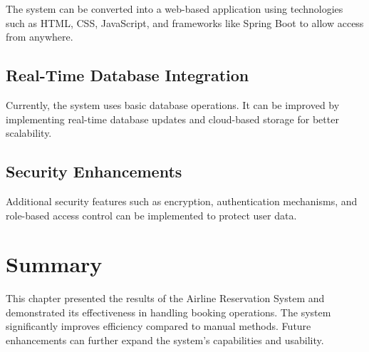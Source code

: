 The system can be converted into a web-based application using technologies such as HTML, CSS, JavaScript, and frameworks like Spring Boot to allow access from anywhere.

\subsection{Real-Time Database Integration}

Currently, the system uses basic database operations. It can be improved by implementing real-time database updates and cloud-based storage for better scalability.

\subsection{Security Enhancements}

Additional security features such as encryption, authentication mechanisms, and role-based access control can be implemented to protect user data.

\section{Summary}

This chapter presented the results of the Airline Reservation System and demonstrated its effectiveness in handling booking operations. The system significantly improves efficiency compared to manual methods. Future enhancements can further expand the system’s capabilities and usability.